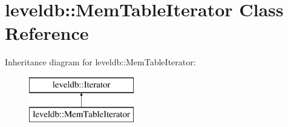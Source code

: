 \hypertarget{classleveldb_1_1_mem_table_iterator}{}\section{leveldb\+:\+:Mem\+Table\+Iterator Class Reference}
\label{classleveldb_1_1_mem_table_iterator}
Inheritance diagram for leveldb\+:\+:Mem\+Table\+Iterator\+:\begin{figure}[H]
\begin{center}
\leavevmode
\includegraphics[height=2.000000cm]{classleveldb_1_1_mem_table_iterator}
\end{center}
\end{figure}

